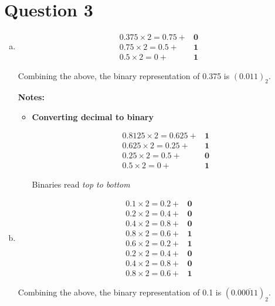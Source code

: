\documentclass[12pt]{article}
\begin{document}
\section*{Question 3}
\begin{enumerate}[a.]
    \item
    \setcounter{equation}{0}
    \begin{align}
        0.375 \times 2 = 0.75 + &\textbf{0}\\
        0.75 \times 2 = 0.5 + &\textbf{1}\\
        0.5 \times 2 = 0 + &\textbf{1}
    \end{align}

    Combining the above, the binary representation of 0.375 is $(0.011)_2$.

    \textbf{Notes:}
    \begin{itemize}
        \item \textbf{Converting decimal to binary}

        \begin{align}
            0.8125 \times 2 = 0.625 + &\textbf{1}\\
            0.625 \times 2 = 0.25 + &\textbf{1}\\
            0.25 \times 2 = 0.5 + &\textbf{0}\\
            0.5 \times 2 = 0 + &\textbf{1}
        \end{align}

        Binaries read \textit{top to bottom}
    \end{itemize}

    \item

    \setcounter{equation}{0}
    \begin{align}
        0.1 \times 2 = 0.2 + &\textbf{0}\\
        0.2 \times 2 = 0.4 + &\textbf{0}\\
        0.4 \times 2 = 0.8 + &\textbf{0}\\
        0.8 \times 2 = 0.6 + &\textbf{1}\\
        0.6 \times 2 = 0.2 + &\textbf{1}\\
        0.2 \times 2 = 0.4 + &\textbf{0}\\
        0.4 \times 2 = 0.8 + &\textbf{0}\\
        0.8 \times 2 = 0.6 + &\textbf{1}
    \end{align}

    Combining the above, the binary representation of 0.1 is $(0.0\overline{0011})_2$.

\end{enumerate}
\end{document}

